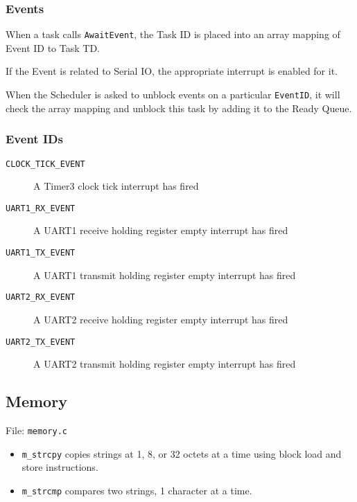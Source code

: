 \documentclass[letterpaper]{article}
\begin{document}
\subsubsection{Events%
  \label{events}%
}

When a task calls \texttt{AwaitEvent}, the Task ID is placed into an array mapping of Event ID to Task TD.

If the Event is related to Serial IO, the appropriate interrupt is enabled for it.

When the Scheduler is asked to unblock events on a particular \texttt{EventID}, it will check the array mapping and unblock this task by adding it to the Ready Queue.


\subsubsection{Event IDs%
  \label{event-ids}%
}
%
\begin{description}
\item[{\texttt{CLOCK\_TICK\_EVENT}}] \leavevmode 
A Timer3 clock tick interrupt has fired

\item[{\texttt{UART1\_RX\_EVENT}}] \leavevmode 
A UART1 receive holding register empty interrupt has fired

\item[{\texttt{UART1\_TX\_EVENT}}] \leavevmode 
A UART1 transmit holding register empty interrupt has fired

\item[{\texttt{UART2\_RX\_EVENT}}] \leavevmode 
A UART2 receive holding register empty interrupt has fired

\item[{\texttt{UART2\_TX\_EVENT}}] \leavevmode 
A UART2 transmit holding register empty interrupt has fired

\end{description}


\subsection{Memory%
  \label{memory}%
}

File: \texttt{memory.c}
%
\begin{itemize}

\item \texttt{m\_strcpy} copies strings at 1, 8, or 32 octets at a time using block load and store instructions.

\item \texttt{m\_strcmp} compares two strings, 1 character at a time.

\end{itemize}
\end{document}
